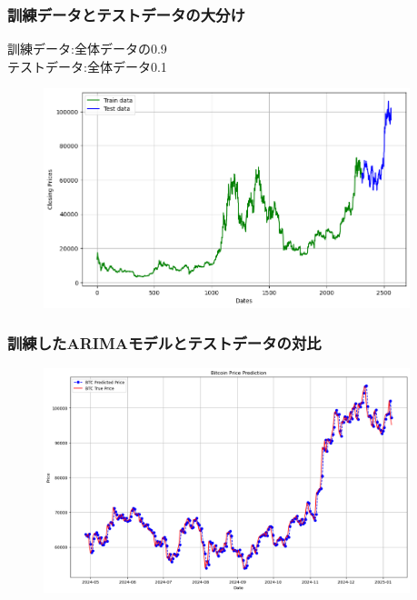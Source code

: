 \documentclass{beamer}  %
\begin{document}
\begin{frame}
    \frametitle{訓練データとテストデータの大分け}
    訓練データ:全体データの0.9\\
    テストデータ:全体データ0.1
    \begin{figure}[h]
        \begin{center}
            \includegraphics[keepaspectratio, width=0.95\textwidth]{pic/ar0.png}
        \end{center}
    \end{figure}
\end{frame}

\begin{frame}
    \frametitle{訓練したARIMAモデルとテストデータの対比}
    \begin{figure}[h]
        \begin{center}
            \includegraphics[keepaspectratio, width=0.95\textwidth]{pic/ar1.png}
        \end{center}
    \end{figure}
\end{frame}
\end{document}
